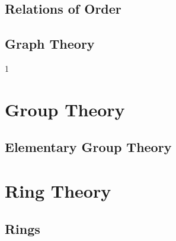 \documentclass{book}                                                           %
\def\compilealgebra{0}
\begin{document}
                \chapter{Relations of Order}
                    \renewcommand{\PATH}{\PARPATH/Relations_of_Order}
                    \label{chapt:Relations_of_Order}%
                    
                    
                \chapter{Graph Theory}
                    \renewcommand{\PATH}{\PARPATH/Graph_Theory}
                    \label{chapt:Graph_Theory}%
                    
        \clearpage
        \setcounter{endpage}{\thepage}
    \else
        \addtocounter{part}{10}
        \addtocounter{chapter}{10}
    \fi

    \if\compilealgebra1
            \renewcommand{\TOPPATH}{books/Algebra}
            \label{book:Algebra}%
            \setcounter{page}{\value{endpage}}
            \part{Group Theory}
                \renewcommand{\PARPATH}{\TOPPATH/Group_Theory}
                \chapter{Elementary Group Theory}
                    \renewcommand{\PATH}{\PARPATH/Elementary_Group_Theory}
                    \label{chapt:Elementary_Group_Theory}%
                    
                    
                    
                    
                    
            \part{Ring Theory}
                \renewcommand{\PARPATH}{\TOPPATH/Ring_Theory}
                \chapter{Rings}
                    \renewcommand{\PATH}{\PARPATH/Elementary_Ring_Theory}
                    
                    
\end{document}
